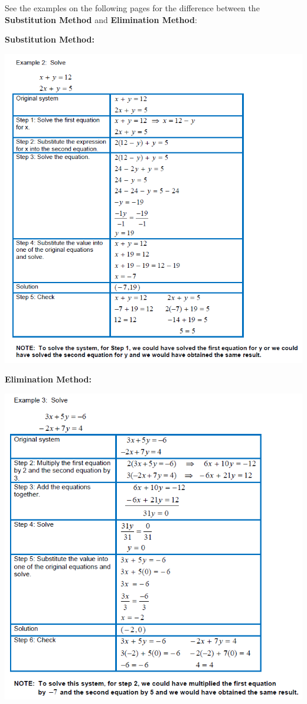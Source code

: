 \documentclass[12pt]{article}
\begin{document}
See the examples on the following pages for the difference between the \textbf{Substitution Method} and \textbf{Elimination Method}:

\textbf{Substitution Method:}

\centerline{\includegraphics[scale = 0.9]{Substitution.png}}

\newpage

\textbf{Elimination Method:}

\centerline{\includegraphics{Elimination.png}}
\end{document}
